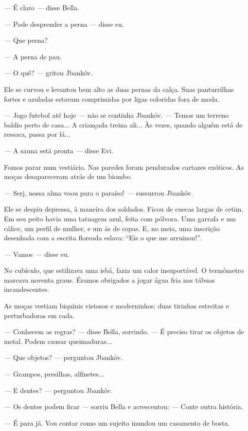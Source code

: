 \emph{---} É claro \emph{---} disse Bella.

\emph{---} Pode desprender a perna \emph{---} disse eu.

\emph{---} Que perna?

\emph{---} A perna de pau.

\emph{---} O quê? \emph{---} gritou Jbankóv.

Ele se curvou e levantou bem alto as duas pernas da calça. Suas
panturrilhas fortes e azuladas estavam comprimidas por ligas coloridas
fora de moda.

\emph{---} Jogo futebol até hoje \emph{---} não se continha Jbankóv.
\emph{---} Temos um terreno baldio perto de casa... A criançada treina
ali... Às vezes, quando alguém está de ressaca, passa por lá...

\emph{---} A sauna está pronta \emph{---} disse Evi.

Fomos parar num vestiário. Nas paredes foram pendurados cartazes
exóticos. As moças desapareceram atrás de um biombo.

\emph{---} Serj, nossa alma voou para o paraíso! \emph{---} sussurrou
Jbankóv.

Ele se despiu depressa, à maneira dos soldados. Ficou de cuecas largas
de cetim. Em seu peito havia uma tatuagem azul, feita com pólvora. Uma
garrafa e um cálice, um perfil de mulher, e um ás de copas. E, no meio,
uma inscrição desenhada com a escrita floreada eslava: ``Eis o que me
arruinou!''.

\emph{---} Vamos \emph{---} disse eu.

No cubículo, que estilizava uma isbá, fazia um calor insuportável. O
termômetro marcava noventa graus. Éramos obrigados a jogar água fria nas
tábuas incandescentes.

As moças vestiam biquínis vistosos e moderninhos: duas tirinhas
estreitas e perturbadoras em cada.

\emph{---} Conhecem as regras? \emph{---} disse Bella, sorrindo.
\emph{---} É preciso tirar os objetos de metal. Podem causar
queimaduras...

\emph{---} Que objetos? \emph{---} perguntou Jbankóv.

\emph{---} Grampos, presilhas, alfinetes...

\emph{---} E dentes? \emph{---} perguntou Jbankóv.

\emph{---} Os dentes podem ficar \emph{---} sorriu Bella e acrescentou:
\emph{---} Conte outra história.

\emph{---} É para já. Vou contar como um sujeito inundou um casamento de
bosta.

